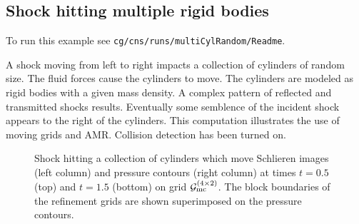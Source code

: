 \newcommand{\Gmc}{\Gc_{\rm mc}}%
\subsection{Shock hitting multiple rigid bodies}\label{sec:shockMultiCyl}

To run this example see {\tt cg/cns/runs/multiCylRandom/Readme}.

A shock moving from left to right impacts a collection of cylinders of random size. 
The fluid
forces cause the cylinders to move. The cylinders are modeled as rigid bodies with a given mass density.
A complex pattern of reflected and transmitted shocks results. Eventually some semblence of the 
incident shock appears to the right of the cylinders. 
This computation illustrates the use of moving grids and AMR. Collision
detection has been turned on.




{
% 
\newcommand{\figWidth}{6.5cm}
\newcommand{\trimfig}[2]{\trimFigb{#1}{#2}{.05}{.05}{.25}{.25}}
% 
\begin{figure}[htb]
\begin{center}
\end{center}
  \caption{Shock hitting a collection of cylinders which move Schlieren images (left column) and pressure contours (right column)
 at times $t=0.5$ (top) and $t=1.5$ (bottom) on grid $\Gmc^{(4\times 2)}$. The block boundaries of the refinement
   grids are shown superimposed on the pressure contours.}%
  \label{fig:shockMultiCylRandom}
\end{figure}
}



